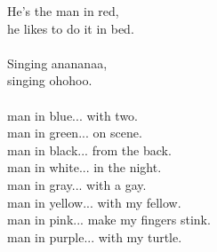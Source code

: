 
            He’s the man in red, \\
            he likes to do it in bed. \\
\hspace{10mm} \\
            Singing anananaa, \\
            singing ohohoo. \\
\hspace{10mm} \\
            man in blue... with two. \\
            man in green... on scene. \\
            man in black... from the back. \\
            man in white... in the night. \\
            man in gray... with a gay. \\
            man in yellow... with my fellow. \\
            man in pink... make my fingers stink. \\
            man in purple... with my turtle. \\
